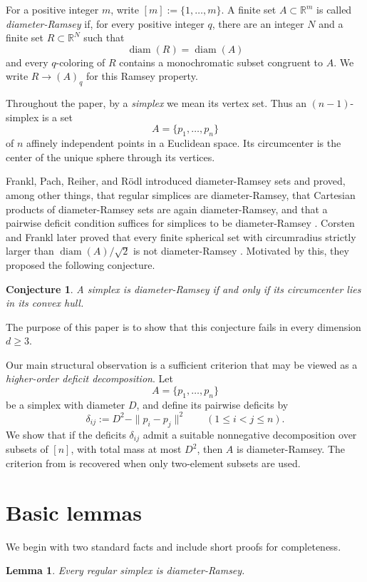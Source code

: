 \documentclass[preprint,12pt]{elsarticle}
\newtheorem{lemma}[theorem]{Lemma}
\newtheorem{conjecture}[theorem]{Conjecture}
\theoremstyle{remark}
\DeclareMathOperator{\diam}{diam}
\begin{document}
For a positive integer $m$, write $[m]:=\{1,\dots,m\}$. A finite set $A\subset \mathbb R^m$ is called \emph{diameter-Ramsey} if, for every positive integer $q$, there are an integer $N$ and a finite set $R\subset \mathbb R^N$ such that
\[
\diam(R)=\diam(A)
\]
and every $q$-coloring of $R$ contains a monochromatic subset congruent to $A$. We write $R\to(A)_q$ for this Ramsey property.

Throughout the paper, by a \emph{simplex} we mean its vertex set. Thus an $(n-1)$-simplex is a set
\[
A=\{p_1,\dots,p_n\}
\]
of $n$ affinely independent points in a Euclidean space. Its circumcenter is the center of the unique sphere through its vertices.

Frankl, Pach, Reiher, and R\"odl introduced diameter-Ramsey sets and proved, among other things, that regular simplices are diameter-Ramsey, that Cartesian products of diameter-Ramsey sets are again diameter-Ramsey, and that a pairwise deficit condition suffices for simplices to be diameter-Ramsey \cite{FPRR}. Corsten and Frankl later proved that every finite spherical set with circumradius strictly larger than $\diam(A)/\sqrt{2}$ is not diameter-Ramsey \cite{CF}. Motivated by this, they \cite{CF} proposed the following conjecture.  
\begin{conjecture}
A simplex is diameter-Ramsey if and only if its circumcenter lies in its convex hull.   
\end{conjecture}


The purpose of this paper is to show that this conjecture fails in every dimension $d\ge 3$.

Our main structural observation is a sufficient criterion that may be viewed as a \emph{higher-order deficit decomposition}. Let
\[
A=\{p_1,\dots,p_n\}
\]
be a simplex with diameter $D$, and define its pairwise deficits by
\[
\delta_{ij}:=D^2-\|p_i-p_j\|^2\qquad (1\le i<j\le n).
\]
We show that if the deficits $\delta_{ij}$ admit a suitable nonnegative decomposition over subsets of $[n]$, with total mass at most $D^2$, then $A$ is diameter-Ramsey. The criterion from \cite[Section~4]{FPRR} is recovered when only two-element subsets are used.

\section{Basic lemmas}
We begin with two standard facts and include short proofs for completeness.

\begin{lemma}\label{lem:regular}
Every regular simplex is diameter-Ramsey.
\end{lemma}
\end{document}
